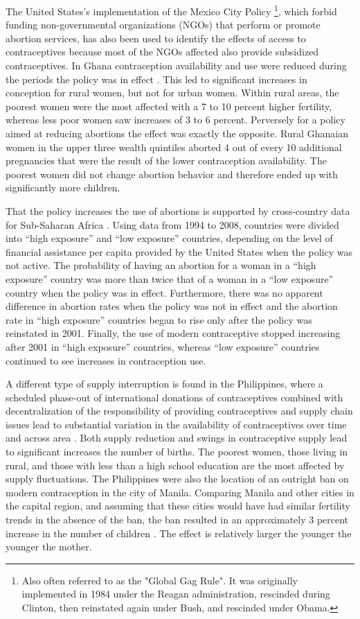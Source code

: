 \documentclass[letterpaper,12pt]{article}
\begin{document}
The United States's implementation of the Mexico City Policy%
\footnote{
Also often referred to as the "Global Gag Rule".
It was originally implemented in 1984 under the Reagan administration,
rescinded during Clinton, then reinstated again under Bush, and
rescinded under Obama.
},
which forbid funding non-governmental organizations (NGOs) that perform or 
promote abortion services, has also been used to identify the
effects of access to contraceptives because most of the NGOs
affected also provide subsidized contraceptives.
In Ghana contraception availability and use were reduced during the 
periods the policy was in effect \citep{Jones2015}.
This led to significant increases in conception for rural women,
but not for urban women.
Within rural areas, the poorest women were the most affected with
a 7 to 10 percent higher fertility, whereas less poor women saw
increases of 3 to 6 percent.
Perversely for a policy aimed at reducing abortions the effect
was exactly the opposite.
Rural Ghanaian women in the upper three wealth quintiles aborted 
4 out of every 10 additional pregnancies that were the result of 
the lower contraception availability.
The poorest women did not change abortion behavior and therefore
ended up with significantly more children.

That the policy increases the use of abortions is supported by
cross-country data for Sub-Saharan Africa \citep{Bendavid2011}.
Using data from 1994 to 2008, countries were divided into 
``high exposure'' and ``low exposure'' countries,
depending on the level of financial assistance per capita
provided by the United States when the policy was not active.
The probability of having an abortion for a woman in a ``high exposure''
country was more than twice that of a woman in a ``low exposure''
country when the policy was in effect. 
Furthermore, there was no apparent difference in abortion rates
when the policy was not in effect and the abortion rate in
``high exposure'' countries began to rise only after the
policy was reinstated in 2001.
Finally, the use of modern contraceptive stopped increasing
after 2001 in ``high exposure'' countries, whereas ``low
exposure'' countries continued to see increases in
contraception use.

A different type of supply interruption is found in the Philippines,
where a scheduled phase-out of international donations of contraceptives
combined with decentralization of the responsibility of providing
contraceptives and supply chain issues lead to substantial variation
in the availability of contraceptives over time and across area \citep{Salas2014}.
Both supply reduction and swings in contraceptive supply lead to
significant increases the number of births.
The poorest women, those living in rural, and those with less than
a high school education are the most affected by supply fluctuations.
The Philippines were also the location of an outright ban on
modern contraception in the city of Manila.
Comparing Manila and other cities in the capital region, and
assuming that these cities would have had similar fertility trends
in the absence of the ban, the ban resulted in an approximately
3 percent increase in the number of children \citep{Dumas2017}.
The effect is relatively larger the younger the younger the mother.
\end{document}
